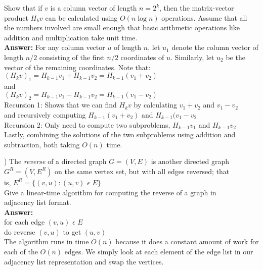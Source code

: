 \documentclass{article}
\begin{document}
\indent Show that if $v$ is a column vector of length $n = 2^k$, then the matrix-vector product $H_{k}v$ can be calculated using $O(n \log n)$ operations. Assume that all the numbers involved are small enough that basic arithmetic operations like addition and multiplication take unit time. \\
\vspace{.1in}
{\bf Answer:} For any column vector $u$ of length $n$, let $u_{1}$ denote the column vector of length $n/2$ consisting of the first $n/2$ coordinates of $u$. Similarly, let $u_{2}$ be the vector of the remaining coordinates. Note that: \\

\indent \indent \indent $(H_{k}v)_{1} = H_{k - 1}v_{1} + H_{k - 1}v_{2} = H_{k - 1}(v_{1} + v_{2})$ \\
and \\
\indent \indent \indent $(H_{k}v)_{2} = H_{k - 1}v_{1} - H_{k - 1}v_{2} = H_{k - 1}(v_{1} - v_{2})$ \\

Recursion 1: Shows that we can find $H_{k}v$ by calculating $v_{1} + v_{2}$ and $v_{1} - v_{2}$ \\
and recursively computing $H_{k - 1}(v_{1} + v_{2})$ and $H_{k - 1}(v_{1} - v_{2}$ \\

Recursion 2: Only need to compute two subproblems, $H_{k - 1}v_{1}$ and $H_{k - 1}v_{2}$ \\

Lastly, combining the solutions of the two subproblems using addition and subtraction, both taking $O(n)$ time. 

\vspace{.3in}
) The \textit{reverse} of a directed graph $G = (V, E)$ is another directed graph \\
\indent $G^{R} = (V, E^{R})$ on the same vertex set, but with all edges reversed; that \\
\indent is, $E^R =\big\{(v, u) : (u, v)$ $\epsilon$ $E\big\}$ \\

Give a linear-time algorithm for computing the reverse of a graph in \\
adjacency list format. \\
\vspace{.1in}
{\bf Answer:} \\
 for each edge $(v, u)$ $\epsilon$ $E$ \\
 \indent do reverse $(v, u)$ to get $(u, v)$ \\

The algorithm runs in time $O(n)$ because it does a constant amount of work for each of the $O(n)$ edges. We simply look at each element of the edge list in our adjacency list representation and swap the vertices. \\
\end{document}
